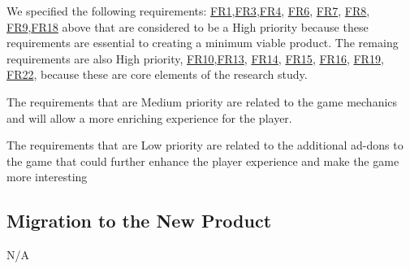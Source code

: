 \documentclass{article}
\begin{document}
We specified the following requirements: \hyperref[FR1]{FR1},\hyperref[FR3]{FR3},\hyperref[FR4]{FR4}, \hyperref[FR6]{FR6}, \hyperref[FR7]{FR7}, \hyperref[FR8]{FR8}, \hyperref[FR9]{FR9},\hyperref[FR18]{FR18} above that are considered to be a High priority because these requirements are essential to creating a minimum viable product. The remaing requirements are also High priority,  \hyperref[FR10]{FR10},\hyperref[FR13]{FR13}, \hyperref[FR14]{FR14}, \hyperref[FR15]{FR15}, \hyperref[FR16]{FR16}, \hyperref[FR19]{FR19}, \hyperref[FR22]{FR22}, because these are core elements of the research study.

The requirements that are Medium priority are related to the game mechanics and will allow a more enriching experience for the player.

The requirements that are Low priority are related to the additional ad-dons to the game that could further enhance the player experience and make the game more interesting

\subsection{Migration to the New Product}
N/A
\end{document}
